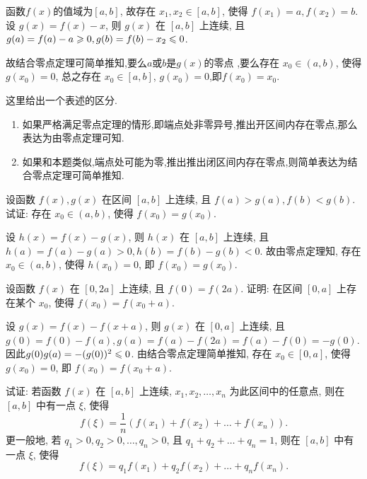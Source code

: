 \begin{solution}
    函数$f(x)$的值域为$[a,b]$, 故存在 $x_1, x_2 \in [a,b]$, 使得 $f(x_1) = a, f(x_2) = b$. 设 $g(x) = f(x) - x$, 则 $g(x)$ 在 $[a,b]$ 上连续, 且 $g(a) = f(a) - a \geqslant 0, g(b) = f(b) - x_2 \leqslant 0$. 

    故结合零点定理可简单推知,要么$a$或$b$是$g(x)$的零点 ,要么存在 $x_0 \in (a,b)$, 使得 $g(x_0) = 0$, 总之存在 $x_0 \in [a,b]$, $g(x_0)=0$,即$f(x_0) = x_0$.

    \begin{remark} 这里给出一个表述的区分.
        \begin{enumerate}
            \item 如果严格满足零点定理的情形,即端点处非零异号,推出开区间内存在零点,那么表达为由零点定理可知.
            \item 如果和本题类似,端点处可能为零,推出推出闭区间内存在零点,则简单表达为结合零点定理可简单推知.
        \end{enumerate}
    \end{remark}
\end{solution}

\begin{exercise}[2.2.5]
    设函数 $f(x), g(x)$ 在区间 $[a,b]$ 上连续, 且 $f(a) > g(a), f(b) < g(b)$. 试证: 存在 $x_0 \in (a,b)$, 使得 $f(x_0)=g(x_0)$.
\end{exercise}

\begin{solution}
    设 $h(x) = f(x) - g(x)$, 则 $h(x)$ 在 $[a,b]$ 上连续, 且 $h(a) = f(a) - g(a) > 0, h(b) = f(b) - g(b) < 0$. 故由零点定理知, 存在 $x_0 \in (a,b)$, 使得 $h(x_0) = 0$, 即 $f(x_0) = g(x_0)$.
\end{solution}

\begin{exercise}[2.2.6]
    设函数 $f(x)$ 在 $[0, 2a]$ 上连续, 且 $f(0)=f(2a)$. 证明: 在区间 $[0,a]$ 上存在某个 $x_0$, 使得 $f(x_0) = f(x_0+a)$.
\end{exercise}

\begin{solution}
    设 $g(x) = f(x) - f(x+a)$, 则 $g(x)$ 在 $[0,a]$ 上连续, 且 $g(0) = f(0) - f(a), g(a) = f(a) - f(2a) = f(a) - f(0) = -g(0)$. 因此$g(0) g(a) = -(g(0))^2 \leqslant 0$. 由结合零点定理简单推知, 存在 $x_0 \in [0,a]$, 使得 $g(x_0) = 0$, 即 $f(x_0) = f(x_0+a)$.
\end{solution}

\begin{exercise}[2.2.7]
    试证: 若函数 $f(x)$ 在 $[a,b]$ 上连续, $x_1, x_2, \dots, x_n$ 为此区间中的任意点, 则在 $[a,b]$ 中有一点 $\xi$, 使得
    $$ f(\xi) = \frac{1}{n}(f(x_1)+f(x_2)+\dots+f(x_n)). $$
    更一般地, 若 $q_1 > 0, q_2 > 0, \dots, q_n > 0$, 且 $q_1+q_2+\dots+q_n=1$, 则在 $[a,b]$ 中有一点 $\xi$, 使得
    $$ f(\xi) = q_1f(x_1)+q_2f(x_2)+\dots+q_nf(x_n). $$
\end{exercise}

